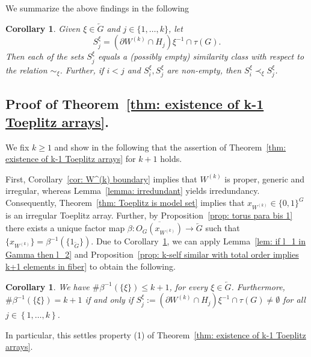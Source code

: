 \documentclass[titlepage,reqno,10pt]{amsart}
\newtheorem{corollary}[theorem]{Corollary}
\theoremstyle{definition}
\newcommand{\set}[1]{\left\{ #1 \right\}}
\begin{document}
We summarize the above findings in the following
\begin{corollary} \label{cor: k similarity class structure}
    Given $\xi\in\overleftarrow{G}$ and $j\in\{1,\ldots ,k\}$, let 
    $$
    S_j^\xi = (\partial W^{(k)} \cap H_j)\xi^{-1} \cap \tau(G) . 
    $$
    Then each of the sets $S_j^\xi$ equals a (possibly empty) similarity class with respect to the relation $\sim_\xi$. Further, if $i<j$ and $S_i^\xi,S_j^\xi$ are non-empty, then $S_i^\xi\prec_\xi S_j^\xi$. 
\end{corollary}


\subsection{Proof of Theorem~\ref{thm: existence of k-1 Toeplitz arrays}.} \label{subsect: proof of main theorem}
We fix $k\geq 1$ and show in the following that the assertion of Theorem~\ref{thm: existence of k-1 Toeplitz arrays} for $k+1$ holds. \medskip

First, Co\-ro\-llary~\ref{cor: W^(k) boundary} implies that $W^{(k)}$ is proper, generic and irregular, whereas Lemma~\ref{lemma: irredundant} yields irredundancy. Consequently, Theorem~\ref{thm: Toeplitz is model set} implies that $x_{W^{(k)}}\in\{0,1\}^G$ is an irregular Toeplitz array. Further, by Proposition~\ref{prop: torus para bis 1} there exists a unique factor map $\beta: \overline{O_G(x_{W^{(k)}})}\to \overleftarrow{G}$ such that $\{x_{W^{(k)}}\}=\beta^{-1}(\{1_{\overleftarrow{G}}\})$. Due to Corollary~\ref{cor: k similarity class structure}, we can apply Lemma~\ref{lem: if l_1 in Gamma then l_2} and Proposition~\ref{prop: k-self similar with total order implies k+1 elements in fiber} to obtain the following. 
\begin{corollary}\label{cor: fiber structure for W^(k)}
 We have $\#\beta^{-1}(\{\xi\})\leq k+1$, for every $\xi\in \overleftarrow{G}$.
 Furthermore, $\# \beta^{-1}(\{\xi\}) = k+1$ if and only if $S_j^\xi := (\partial W^{(k)} \cap H_j)\xi^{-1} \cap \tau(G) \neq \emptyset$ for all $j\in \set{1,\ldots,k}$.
\end{corollary}
In particular, this settles property (1) of Theorem~\ref{thm: existence of k-1 Toeplitz arrays}.\medskip
\end{document}
